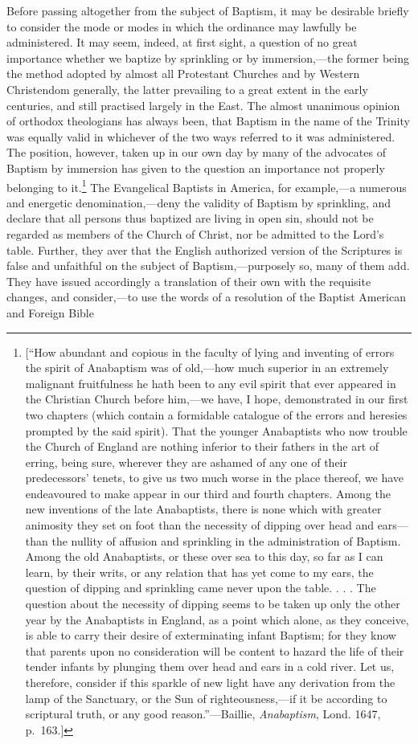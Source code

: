 \documentclass[english,]{book}
\begin{document}
Before passing altogether from the subject of Baptism, it may be desirable briefly to consider the mode or modes in which the ordinance may lawfully be administered. It may seem, indeed, at first sight, a question of no great importance whether we baptize by sprinkling or by immersion,---the former being the method adopted by almost all Protestant Churches and by Western Christendom generally, the latter prevailing to a great extent in the early centuries, and still practised largely in the East. The almost unanimous opinion of orthodox theologians has always been, that Baptism in the name of the Trinity was equally valid in whichever of the two ways referred to it was administered. The position, however, taken up in our own day by many of the advocates of Baptism by immersion has given to the question an importance not properly belonging to it.\footnote{{[}``How abundant and copious in the faculty of lying and inventing of errors the spirit of Anabaptism was of old,---how much superior in an extremely malignant fruitfulness he hath been to any evil spirit that ever appeared in the Christian Church before him,---we have, I hope, demonstrated in our first two chapters (which contain a formidable catalogue of the errors and heresies prompted by the said spirit). That the younger Anabaptists who now trouble the Church of England are nothing inferior to their fathers in the art of erring, being sure, wherever they are ashamed of any one of their predecessors' tenets, to give us two much worse in the place thereof, we have endeavoured to make appear in our third and fourth chapters. Among the new inventions of the late Anabaptists, there is none which with greater animosity they set on foot than the necessity of dipping over head and ears---than the nullity of affusion and sprinkling in the administration of Baptism. Among the old Anabaptists, or these over sea to this day, so far as I can learn, by their writs, or any relation that has yet come to my ears, the question of dipping and sprinkling came never upon the table. . . . The question about the necessity of dipping seems to be taken up only the other year by the Anabaptists in England, as a point which alone, as they conceive, is able to carry their desire of exterminating infant Baptism; for they know that parents upon no consideration will be content to hazard the life of their tender infants by plunging them over head and ears in a cold river. Let us, therefore, consider if this sparkle of new light have any derivation from the lamp of the Sanctuary, or the Sun of righteousness,---if it be according to scriptural truth, or any good reason.''---Baillie, \emph{Anabaptism}, Lond. 1647, p.~163.{]}} The Evangelical Baptists in America, for example,---a numerous and energetic denomination,---deny the validity of Baptism by sprinkling, and declare that all persons thus baptized are living in open sin, should not be regarded as members of the Church of Christ, nor be admitted to the Lord's table. Further, they aver that the English authorized version of the Scriptures is false and unfaithful on the subject of Baptism,---purposely so, many of them add. They have issued accordingly a translation of their own with the requisite changes, and consider,---to use the words of a resolution of the Baptist American and Foreign Bible 
\end{document}
